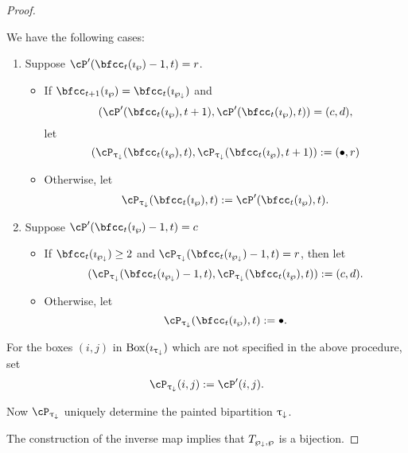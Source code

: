 \documentclass[12pt,a4paper]{amsart}
\numberwithin{equation}{section}
\theoremstyle{remark}
\def\BOX#1{\mathrm{Box}(#1)}
\begin{document}
\begin{proof}
{\begin{description}
           \def\xxn{\cP_{\uptaum}(\bfcc_t(\imath_{\PPm})-1,t)} %
           \def\xxo{\cP_{\uptaum}(\bfcc_t(\imath_{\wp}),t)} %
           \def\xxd{\cP_{\uptaum}(\bfcc_t(\imath_{\wp}),t+1)} %
           \def\yyn{\cP'(\bfcc_t(\imath_{\PPm})-1,t)} %
           \def\yyo{\cP'(\bfcc_t(\imath_{\wp})-1,t)} %
           \def\yyt{\cP'(\bfcc_t(\imath_{\wp}),t)} %
           \def\yyd{\cP'(\bfcc_t(\imath_{\wp}),t+1)} %
           We have the following cases:
           \begin{enumerate}[label=(\alph*)]
             \item Suppose $\yyo=r$.
             \begin{itemize}
               \item If $\bfcc_{t+1}(\imath_{\wp}) = \bfcc_{t}(\imath_{\PPm})$
               and
               \[
                 (\yyd,\yyt) = (c,d),
               \]
               let
               \[
                 (\xxo,\xxd):=(\bullet, r)
               \]
               \item Otherwise, let \[
                 \xxo:=\yyt.
               \]
             \end{itemize}
             \item Suppose $\yyo=c$
             \begin{itemize}
               \item If $\bfcc_{t}(\imath_{\PPm})\geq 2$ and $\xxn=r$,
               then let
               \[
                 (\xxn,\xxo):=(c,d).
               \]
               \item Otherwise, let
               \[
                 \xxo :=\bullet.
               \]
             \end{itemize}
           \end{enumerate}
           For the boxes $(i,j)$ in $\BOX{\imath_{\uptaum}}$ which are not specified
           in the above procedure, set
           \[
           \cP_{\uptaum}(i,j):=\cP'(i,j).
           \]
     \item[STEP 3]
           Now $\cP_{\uptaum}$ uniquely determine the painted bipartition
           $\uptau_{\downarrow}$.
   \end{description}
   The construction of the inverse map implies that $T_{\wp_{\downarrow},\wp}$ is a
   bijection.
 }

  \def\ckcOa{\ckcO^{\uparrow}}
  \def\PPa{\wp^{\uparrow}}
  \def\PPam{\wp^{\uparrow}_{\downarrow}}
  \def\uptaua{\uptau^{\uparrow}}
  \def\tauPPa{\tau_{\PPa}}
  \def\tauPPam{\tau_{\PPam}}
  \def\stara{\star^{\uparrow}}


\end{proof}
\end{document}
